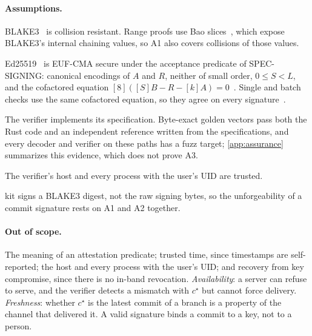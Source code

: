 \documentclass[10pt,letterpaper]{article}
\theoremstyle{remark}
\newcommand{\kit}{\textsf{kit}}
\begin{document}
\paragraph{Assumptions.}
\begin{description}[leftmargin=1.5em]
  \item[A1 (hash).] BLAKE3~\cite{blake3} is collision resistant. Range proofs
        use Bao slices~\cite{bao}, which expose BLAKE3's internal chaining
        values, so A1 also covers collisions of those values.
  \item[A2 (signature).] Ed25519~\cite{ed25519,rfc8032} is EUF-CMA secure
        under the acceptance predicate of SPEC-SIGNING: canonical
        encodings of $A$ and $R$, neither of small order, $0 \le S < L$, and
        the cofactored equation $[8]([S]B - R - [k]A) = 0$~\cite{taming}.
        Single and batch checks use the same cofactored equation, so they
        agree on every signature~\cite{taming}.
  \item[A3 (implementation).] The verifier implements its specification.
        Byte-exact golden vectors pass both the Rust code and an independent
        reference written from the specifications, and every decoder and
        verifier on these paths has a fuzz target; \cref{app:assurance}
        summarizes this evidence, which does not prove A3.
  \item[A4 (host).] The verifier's host and every process with the user's UID
        are trusted.
\end{description}
\kit{} signs a BLAKE3 digest, not the raw signing bytes, so the unforgeability
of a commit signature rests on A1 and A2 together.

\paragraph{Out of scope.}
The meaning of an attestation predicate; trusted time, since timestamps are
self-reported; the host and every process with the user's UID; and recovery
from key compromise, since there is no in-band revocation.
\emph{Availability}: a server can refuse to serve, and the verifier detects a
mismatch with $c^\star$ but cannot force delivery. \emph{Freshness}: whether
$c^\star$ is the latest commit of a branch is a property of the channel that
delivered it. A valid signature binds a commit to a key, not to a person.
\end{document}
